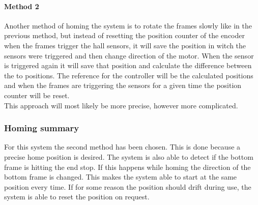 \documentclass[../../../main]{subfiles}
\begin{document}
\paragraph{Method 2}%
\label{par:method_2}
Another method of homing the system is to rotate the frames slowly like in the previous method, but instead of resetting the position counter of the encoder when the frames trigger the hall sensors, it will save the position in witch the sensors were triggered and then change direction of the motor.
When the sensor is triggered again it will save that position and calculate the difference between the to positions.
The reference for the controller will be the calculated positions and when the frames are triggering the sensors for a given time the position counter will be reset.
\\
This approach will most likely be more precise, however more complicated.

\subsubsection{Homing summary}%
\label{ssub:homing_summary}
For this system the second method has been chosen. This is done because a precise home position is desired.
The system is also able to detect if the bottom frame is hitting the end stop. If this happens while homing the direction of the bottom frame is changed. 
This makes the system able to start at the same position every time.
If for some reason the position should drift during use, the system is able to reset the position on request.
\end{document}
